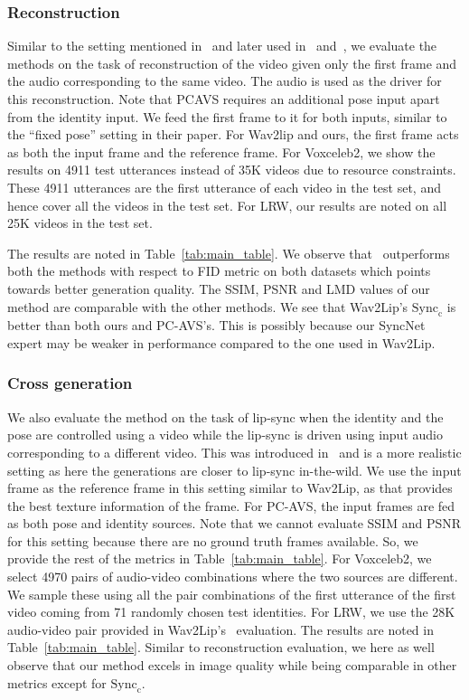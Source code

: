 \subsubsection{Reconstruction}\label{sec:recon}
Similar to the setting mentioned in~\cite{pcavs} and later used in~\cite{gcavt} and~\cite{avcat}, we evaluate the methods on the task of reconstruction of the video given only the first frame and the audio corresponding to the same video. The audio is used as the driver for this reconstruction. Note that PCAVS requires an additional pose input apart from the identity input. We feed the first frame to it for both inputs, similar to the ``fixed pose'' setting in their paper. For Wav2lip and ours, the first frame acts as both the input frame and the reference frame. For Voxceleb2, we show the results on 4911 test utterances instead of 35K videos due to resource constraints. These 4911 utterances are the first utterance of each video in the test set, and hence cover all the videos in the test set. For LRW, our results are noted on all 25K videos in the test set.

The results are noted in Table~\ref{tab:main_table}. We observe that \ours~outperforms both the methods with respect to FID metric on both datasets which points towards better generation quality. The SSIM, PSNR and LMD values of our method are comparable with the other methods. We see that Wav2Lip's  $\text{Sync}_\text{c}$ is better than both ours and PC-AVS's. This is possibly because our SyncNet expert may be weaker in performance compared to the one used in Wav2Lip. 

\vspace{-0.1in}
\subsubsection{Cross generation}\label{sec:cross}
\vspace{-0.1in}
We also evaluate the method on the task of lip-sync when the identity and the pose are controlled using a video while the lip-sync is driven using input audio corresponding to a different video. This was introduced in~\cite{wav2lip} and is a more realistic setting as here the generations are closer to lip-sync in-the-wild. We use the input frame as the reference frame in this setting similar to Wav2Lip, as that provides the best texture information of the frame. For PC-AVS, the input frames are fed as both pose and identity sources. Note that we cannot evaluate SSIM and PSNR for this setting because there are no ground truth frames available. So, we provide the rest of the metrics in Table~\ref{tab:main_table}. For Voxceleb2, we select 4970 pairs of audio-video combinations where the two sources are different. We sample these using all the pair combinations of the first utterance of the first video coming from 71 randomly chosen test identities. For LRW, we use the 28K audio-video pair provided in Wav2Lip's~\cite{wav2lip} evaluation.  
 The results are noted in Table~\ref{tab:main_table}. Similar to reconstruction evaluation, we here as well observe that our method excels in image quality while being comparable in other metrics except for $\text{Sync}_\text{c}$.

